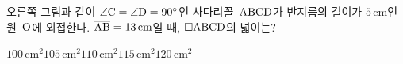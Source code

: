 \noindent\begin{minipage}[t]{0.58\linewidth}\vspace{0pt}\raggedright 오른쪽 그림과 같이 $\angle\mathrm{C}=\angle\mathrm{D}=90^\circ$인 사다리꼴~$\mathrm{ABCD}$가 반지름의 길이가 $5\,\mathrm{cm}$인 원~$\mathrm{O}$에 외접한다. $\overline{\mathrm{AB}}=13\,\mathrm{cm}$일 때, $\square\mathrm{ABCD}$의 넓이는?\end{minipage}\hfill\begin{minipage}[t]{0.4\linewidth}\vspace{0pt}\centering \resizebox{\ifdim\width>\linewidth\linewidth\else\width\fi}{!}{}\end{minipage}\par
\begin{choices32}{$100\,\mathrm{cm}^2$}{$105\,\mathrm{cm}^2$}{$110\,\mathrm{cm}^2$}{$115\,\mathrm{cm}^2$}{$120\,\mathrm{cm}^2$}\end{choices32}
